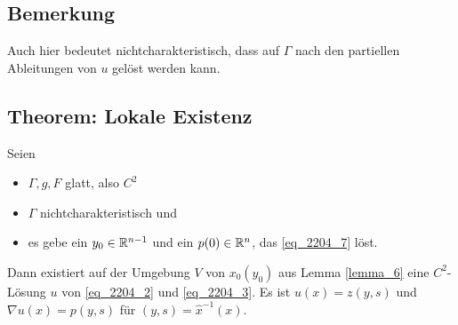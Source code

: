 \subsection{Bemerkung}
\label{bem_8}
	Auch hier bedeutet nichtcharakteristisch,\marginnote{[7]} dass auf $\Gamma$ nach den partiellen Ableitungen von $u$ gelöst werden kann.
	
\subsection{Theorem: Lokale Existenz}
\label{thm_lok_existenz} \label{thm_8}
	Seien \marginnote{[8]} \begin{itemize}
		\item $\Gamma, g, F$ glatt, also $C^2$
		\item $\Gamma$ nichtcharakteristisch und
		\item es gebe ein $y_0 \in \mathbb{R}^{n-1}$ und ein $p(0) \in \mathbb{R}^n$, das \eqref{eq_2204_7} löst.
	\end{itemize}
	Dann existiert auf der Umgebung $V$ von $x_0(y_0)$ aus Lemma \eqref{lemma_6} eine $C^2$-Lösung $u$ von \eqref{eq_2204_2} und \eqref{eq_2204_3}. Es ist $u(x) = z(y,s)$ und $\nabla u(x) = p(y,s)$ für $(y,s) = \widehat{x}^{-1} (x)$.

